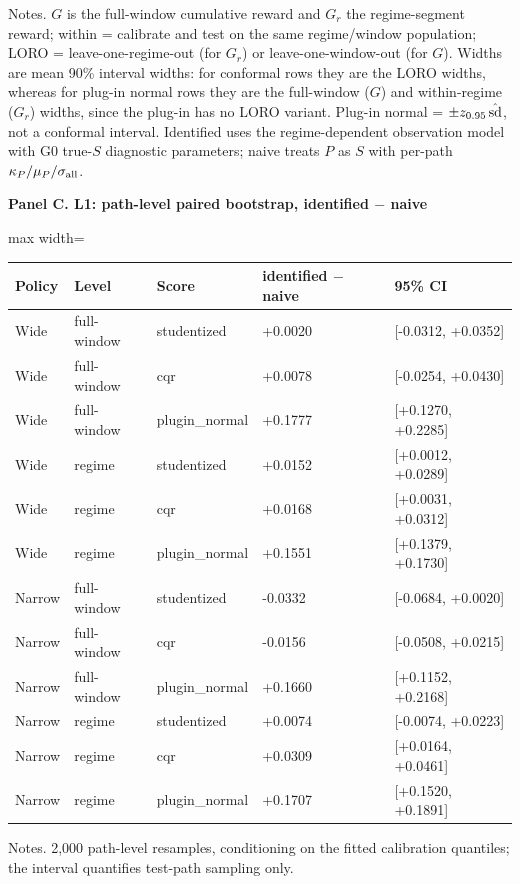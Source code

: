 \begin{table}[!ht]
\par\noindent\begin{minipage}{\linewidth}\raggedright{\scriptsize Notes. $G$ is the full-window cumulative reward and $G_r$ the regime-segment reward; within = calibrate and test on the same regime/window population; LORO = leave-one-regime-out (for $G_r$) or leave-one-window-out (for $G$). Widths are mean 90\% interval widths: for conformal rows they are the LORO widths, whereas for plug-in normal rows they are the full-window ($G$) and within-regime ($G_r$) widths, since the plug-in has no LORO variant. Plug-in normal = $\pm z_{0.95}\,\hat{\rm sd}$, not a conformal interval. Identified uses the regime-dependent observation model with G0 true-$S$ diagnostic parameters; naive treats $P$ as $S$ with per-path $\kappa_P/\mu_P/\sigma_{\rm all}$.}\end{minipage}\par

\par\textbf{Panel C. L1: path-level paired bootstrap, identified $-$ naive}

\begin{adjustbox}{max width=\linewidth}
\begin{tabular}{@{}lllll@{}}
\toprule
Policy & Level & Score & identified $-$ naive & 95\% CI \\
\midrule
Wide & full-window & studentized & +0.0020 & [-0.0312, +0.0352] \\
Wide & full-window & cqr & +0.0078 & [-0.0254, +0.0430] \\
Wide & full-window & plugin\_normal & +0.1777 & [+0.1270, +0.2285] \\
Wide & regime & studentized & +0.0152 & [+0.0012, +0.0289] \\
Wide & regime & cqr & +0.0168 & [+0.0031, +0.0312] \\
Wide & regime & plugin\_normal & +0.1551 & [+0.1379, +0.1730] \\
Narrow & full-window & studentized & -0.0332 & [-0.0684, +0.0020] \\
Narrow & full-window & cqr & -0.0156 & [-0.0508, +0.0215] \\
Narrow & full-window & plugin\_normal & +0.1660 & [+0.1152, +0.2168] \\
Narrow & regime & studentized & +0.0074 & [-0.0074, +0.0223] \\
Narrow & regime & cqr & +0.0309 & [+0.0164, +0.0461] \\
Narrow & regime & plugin\_normal & +0.1707 & [+0.1520, +0.1891] \\
\bottomrule
\end{tabular}
\end{adjustbox}
\vspace{0.5em}
\par\noindent\begin{minipage}{\linewidth}\raggedright{\scriptsize Notes. 2,000 path-level resamples, conditioning on the fitted calibration quantiles; the interval quantifies test-path sampling only.}\end{minipage}\par

\end{table}
